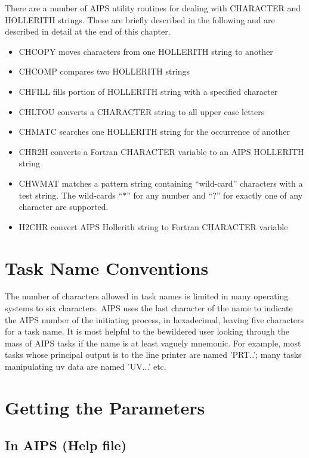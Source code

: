  There are a number of AIPS utility routines for dealing with
CHARACTER and HOLLERITH strings.  These are briefly described in the
following and are described in detail at the end of this chapter.
\begin{itemize} %
\item {}
CHCOPY  moves characters from one HOLLERITH string to another
\item CHCOMP compares two HOLLERITH strings
\item CHFILL fills portion of HOLLERITH string with a specified character
\item CHLTOU converts a CHARACTER string to all upper case letters
\item CHMATC searches one HOLLERITH string for the occurrence of another
\item CHR2H converts a Fortran CHARACTER variable to an AIPS HOLLERITH string
\item CHWMAT matches a pattern string containing ``wild-card'' characters
with a test string.  The wild-cards ``$\ast$'' for any number and ``?'' for
exactly one of any character are supported.
\item H2CHR convert AIPS Hollerith string to Fortran
CHARACTER variable
\end{itemize} %


\section{Task Name Conventions}
The number of characters allowed in task names is limited in many
operating systems to six characters.  AIPS uses the last character of
the name to indicate the AIPS number of the initiating process, in
hexadecimal, leaving five characters for a task name.  It is most
helpful to the bewildered user looking through the mass of AIPS tasks
if the name is at least vaguely mnemonic.  For example, most tasks
whose principal output is to the line printer are named 'PRT..'; many
tasks manipulating uv data are named 'UV...' etc.
\section{Getting the Parameters}

\subsection{In AIPS (Help file)}

